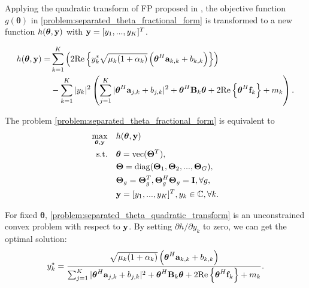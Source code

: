 Applying the quadratic transform of FP proposed in \cite{shen2018fractional}, 
the objective function $g(\boldsymbol{\theta})$ in \eqref{problem:separated_theta_fractional_form} 
is transformed to a new function $h(\boldsymbol{\theta}, {\bf y})$ with ${\bf y} = [y_1,...,y_K]^T$.

\begin{align}
    h(\boldsymbol{\theta}, {\bf y}) = & \sum_{k=1}^K\left( 2 \mathrm{Re} \left\{ y_k^* \sqrt{\mu_k (1+\alpha_k)} \left( \boldsymbol{\theta}^H {\bf a}_{k,k} + b_{k,k} \right) \right\} \right)  \nonumber\\
    & -\sum_{k=1}^K |y_k|^2 \left(\sum_{j=1}^K |\boldsymbol{\theta}^H {\bf a}_{j,k} + b_{j,k}|^2 + \boldsymbol{\theta}^H {\bf B}_k \boldsymbol{\theta} + 2 \mathrm{Re} \left\{ \boldsymbol{\theta}^H {\bf f}_k \right\} + m_k \right). 
\end{align}

The problem \eqref{problem:separated_theta_fractional_form} is equivalent to 
\begin{subequations}\label{problem:separated_theta_quadratic_transform}
    \begin{align} 
        \max_{\boldsymbol{\theta},\mathbf{y}} \quad & h(\boldsymbol{\theta}, {\bf y}) \\  
        \mathrm{s.t.} \quad &  \boldsymbol{\theta} = \mathrm{vec}({\bf \Theta}^T),
        \\ & {\bf \Theta} = \mathrm{diag}({\bf \Theta}_1,{\bf \Theta}_2,...,{\bf \Theta}_G) ,
        \\ &{\bf \Theta}_g = {\bf \Theta}_g^T, {\bf \Theta}_g^H{\bf \Theta}_g = {\bf I}, \forall g,
        \\ & {\bf y} = [y_1,...,y_K]^T, y_k \in \mathbb{C}, \forall k.
    \end{align}
\end{subequations}

For fixed $\boldsymbol{\theta}$, \eqref{problem:separated_theta_quadratic_transform} is an unconstrained convex problem
with respect to $\bf{y}$. By setting $\partial h / \partial y_k$ to zero, we can get the optimal solution:
\begin{equation} \label{eqn:separated_optimal_y}
    y^\star_k = \frac{\sqrt{\mu_k (1+\alpha_k)} \left(\boldsymbol{\theta}^H {\bf a}_{k,k} + b_{k,k} \right)}{\sum_{j=1}^K |\boldsymbol{\theta}^H {\bf a}_{j,k} + b_{j,k}|^2 + \boldsymbol{\theta}^H {\bf B}_k \boldsymbol{\theta} + 2 \mathrm{Re} \left\{ \boldsymbol{\theta}^H {\bf f}_k \right\} + m_k}.
\end{equation}

